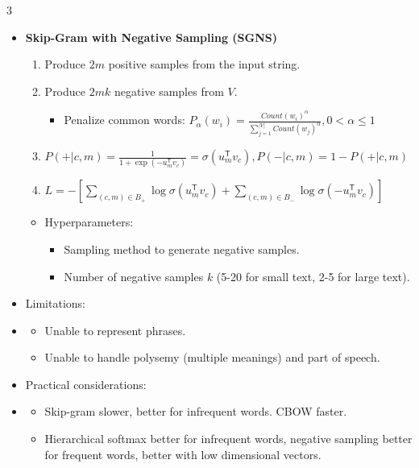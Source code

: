\documentclass[10pt, landscape]{article}
\begin{document}
\begin{multicols*}{3}
\begin{itemize}
\begin{itemize}
      \item \textbf{Skip-Gram with Negative Sampling (SGNS)}
      \begin{enumerate}
        \item Produce $2m$ positive samples from the input string.
        \item Produce $2mk$ negative samples from $V$.
        \begin{itemize}
          \item Penalize common words: $P_\alpha(w_i) = \frac{Count(w_i)^\alpha}{\sum_{j=1}^{|V|}Count(w_j)^\alpha}, 0<\alpha\leq1$
        \end{itemize}
        \item $P(+|c,m) = \frac{1}{1+\exp(-u_{m}^\mathsf{T}v_c)} = \sigma(u_{m}^\mathsf{T}v_c), P(-|c,m) = 1 - P(+|c,m)$
        \item $L = -\left[\sum_{(c,m)\in B_+}\log\sigma(u_{m}^\mathsf{T}v_c) + \sum_{(c,m)\in B_-}\log\sigma(-u_{m}^\mathsf{T}v_c)\right]$
      \end{enumerate}
      \begin{itemize}
        \item Hyperparameters:
        \begin{itemize}
          \item Sampling method to generate negative samples.
          \item Number of negative samples $k$ (5-20 for small text, 2-5 for large text).
        \end{itemize}
      \end{itemize}

      \item Limitations:
      \item \begin{itemize}
        \item Unable to represent phrases.
        \item Unable to handle polysemy (multiple meanings) and part of speech.
      \end{itemize}

      \item Practical considerations:
      \item \begin{itemize}
        \item Skip-gram slower, better for infrequent words. CBOW faster.
        \item Hierarchical softmax better for infrequent words, negative sampling better for frequent words, better with low dimensional vectors.
      \end{itemize}
    \end{itemize}
  \end{itemize}


\end{multicols*}
\end{document}
